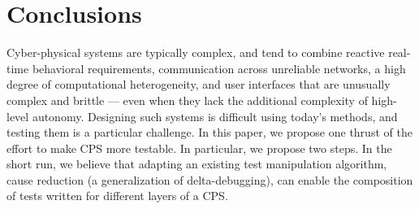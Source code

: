 \section{Conclusions}

Cyber-physical systems are typically complex, and tend to combine reactive real-time behavioral requirements, communication across unreliable networks, a high degree of computational heterogeneity, and user interfaces that are unusually complex and brittle --- even when they lack the additional complexity of high-level autonomy.  Designing such systems is difficult using today's methods, and testing them is a particular challenge.  In this paper, we propose one thrust of the effort to make CPS more testable.  In particular, we propose two steps.  In the short run, we believe that adapting an existing test manipulation algorithm, cause reduction (a generalization of delta-debugging), can enable the composition of tests written for different layers of a CPS.   